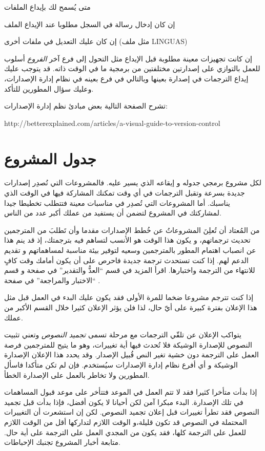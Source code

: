 \startitemize[1]
\item متى يُسمح لك بإيداع الملفات
\item إن كان إدخال رسالة في السجل مطلوبا عند الإيداع الملف
\item إن كان عليك التعديل في ملفات أخرى (مثل ملف LINGUAS)
\item إن كانت تجهيزات معينة مطلوبة قبل الإيداع مثل التحول إلى فرع آخر
\stopitemize
{\it الفروع} أسلوب للعمل بالتوازي على إصدارتين مختلفتين من برمجية ما في
الوقت ذاته. قد يتوجب عليك إيداع الترجمات في إصدارة بعينها وبالتالي في
فرع بعينه في نظام إدارة الإصدارات، وعليك سؤال المطورين للتأكد.

تشرح الصفحة التالية بعض مبادئ نظم إدارة الإصدارات:

http://betterexplained.com/articles/a-visual-guide-to-version-control

\section{جدول المشروع}
لكل مشروع برمجي جدوله و إيقاعه الذي يسير عليه. فالمشروعات التي تُصدِر
إصدارات جديدة بسرعة وتقبل الترجمات في أي وقت تمكنك المشاركة فيها في
الوقت الذي يناسبك. أما المشروعات التي تُصدِر في مناسبات معينة فتتطلب
تخطيطا جيدا لمشاركتك في المشروع لتضمن أن يستفيد من عملك أكبر عدد من
الناس.

من المُعتاد أن تُعلِنَ المشروعاتُ عن خُطط الإصدارات مقدما وأن تَطلبَ من
المترجمين تحديث ترجماتهم، و يكون هذا الوقت هو الأنسب لتساهم فيه
بترجمتك، إذ قد ينم هذا عن انصباب اهتمام المطور بالمترجمين وسعيه لتوفير
بيئة مناسبة لمساهماتهم و تقديم الدعم لهم. إذا كنت تستحدث ترجمة جديدة
فاحرص على أن يكون أمامك وقت كافٍ للانتهاء من الترجمة واختبارها. اقرأ
المزيد في قسم “العدُّ والتقدير” في صفحة \at[ref:33531520] و
قسم “الاختبار والمراجعة” في صفحة \at[ref:34441726].

إذا كنت تترجم مشروعا ضخما للمرة الأولى فقد يكون عليك البدء في العمل قبل
مثل هذا الإعلان بفترة كبيرة على أيّ حال، لذا فلن يؤثر الإعلان كثيرا
خلال القسم الأكبر من عملك.

يتواكب الإعلان عن تلقّي الترجمات مع مرحلة تسمى {\it تجميد النصوص} وتعني
تثبيت النصوص للإصدارة الوشيكة فلا تُحدث فيها أية تغييرات، وهو ما يتيح
للمترجمين فرصة العمل على الترجمة دون خشية تغير النص قُبيل الإصدار. وقد
يحدد هذا الإعلان الإصدارة الوشيكة و أي أفرع نظام إدارة الإصدارات
سيُستخدم. فإن لم تكن متأكدا فاسأل المطورين ولا تخاطر بالعمل على
الإصدارة الخطأ.

إذا بدأت متأخرا كثيرا فقد لا تتم العمل في الموعد فتتأخر على موعد قبول
المساهمات في تلك الإصدارة. البدء مبكرا آمن لكن أحيانا لا يكون أفضل،
فإذا بدأت قبل تجميد النصوص فقد تطرأ تغييرات قبل إعلان تجميد النصوص. لكن
إن استشعرت أن التغييرات المحتملة في النصوص قد تكون قليلة،و الوقت اللازم
لتداركها أقل من الوقت اللازم للعمل على الترجمة كلها، فقد يكون من المجدي
العمل على الترجمة على أية حال. متابعة أخبار المشروع تجنبك الإحباطات.

